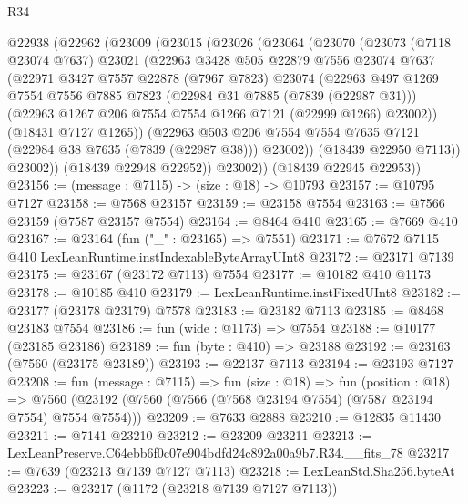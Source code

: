 \begin{lexlean}{R34}
\begin{coremodule}
  @22938
    (@22962
      (@23009
        (@23015
          (@23026
            (@23064
              (@23070
                (@23073
                  (@7118 @23074 @7637)
                  @23021
                  (@22963
                    @3428
                    @505
                    @22879
                    @7556
                    @23074
                    @7637
                    (@22971
                      @3427
                      @7557
                      @22878
                      (@7967 @7823)
                      @23074
                      (@22963
                        @497
                        @1269
                        @7554
                        @7556
                        @7885
                        @7823
                        (@22984 @31 @7885 (@7839 (@22987 @31)))
                        (@22963 @1267 @206 @7554 @7554 @1266 @7121 (@22999 @1266) @23002))
                      (@18431 @7127 @1265))
                    (@22963
                      @503
                      @206
                      @7554
                      @7554
                      @7635
                      @7121
                      (@22984 @38 @7635 (@7839 (@22987 @38)))
                      @23002))
                  (@18439 @22950 @7113))
                @23002))
            (@18439 @22948 @22952))
          @23002))
      (@18439 @22945 @22953))
@23156 := (message : @7115) -> (size : @18) -> @10793
@23157 := @10795 @7127
@23158 := @7568 @23157
@23159 := @23158 @7554
@23163 := @7566 @23159 (@7587 @23157 @7554)
@23164 := @8464 @410
@23165 := @7669 @410
@23167 := @23164 (fun ("_" : @23165) => @7551)
@23171 := @7672 @7115 @410 LexLeanRuntime.instIndexableByteArrayUInt8
@23172 := @23171 @7139
@23175 := @23167 (@23172 @7113) @7554
@23177 := @10182 @410 @1173
@23178 := @10185 @410
@23179 := LexLeanRuntime.instFixedUInt8
@23182 := @23177 (@23178 @23179) @7578
@23183 := @23182 @7113
@23185 := @8468 @23183 @7554
@23186 := fun (wide : @1173) => @7554
@23188 := @10177 (@23185 @23186)
@23189 := fun (byte : @410) => @23188
@23192 := @23163 (@7560 (@23175 @23189))
@23193 := @22137 @7113
@23194 := @23193 @7127
@23208 := fun (message : @7115) =>
  fun (size : @18) =>
  fun (position : @18) =>
  @7560 (@23192 (@7560 (@7566 (@7568 @23194 @7554) (@7587 @23194 @7554) @7554 @7554)))
@23209 := @7633 @2888
@23210 := @12835 @11430
@23211 := @7141 @23210
@23212 := @23209 @23211
@23213 := LexLeanPreserve.C64ebb6f0c07e904bdfd24c892a00a9b7.R34.__fits_78
@23217 := @7639 (@23213 @7139 @7127 @7113)
@23218 := LexLeanStd.Sha256.byteAt
@23223 := @23217 (@1172 (@23218 @7139 @7127 @7113))

\end{coremodule}
\end{lexlean}
